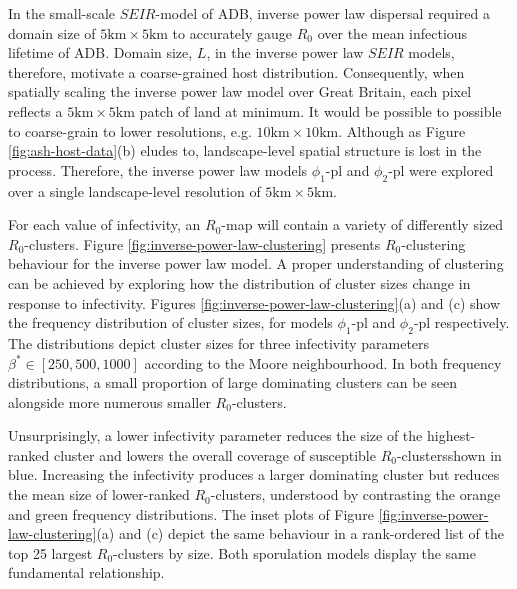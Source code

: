In the small-scale $SEIR$-model of ADB, inverse power law dispersal required a domain size of $\mathrm{5km \times 5km}$ to accurately gauge $R_0$ over the mean infectious lifetime of ADB.
Domain size, $L$, in the inverse power law $SEIR$ models, therefore, motivate a coarse-grained host distribution.
Consequently, when spatially scaling the inverse power law model over Great Britain, each pixel reflects a $\mathrm{5km \times 5km}$ patch of land at minimum.
It would be possible to possible to coarse-grain to lower resolutions, e.g. $\mathrm{10km \times 10km}$.
Although as Figure \ref{fig:ash-host-data}(b) eludes to, landscape-level spatial structure is lost in the process.
Therefore, the inverse power law models $\phi_1$-pl and $\phi_2$-pl were explored over a single landscape-level resolution of $\mathrm{5km \times 5km}$.

For each value of infectivity, an $R_0$-map will contain a variety of differently sized $R_0$-clusters.
Figure \ref{fig:inverse-power-law-clustering} presents $R_0$-clustering behaviour for the inverse power law model.
A proper understanding of clustering can be achieved by exploring how the distribution of cluster sizes change in response to infectivity. 
Figures \ref{fig:inverse-power-law-clustering}(a) and (c) show the frequency distribution of cluster sizes, 
for models $\phi_1$-pl and $\phi_2$-pl respectively.
The distributions depict cluster sizes for three infectivity parameters $\beta^* \in [250, 500, 1000]$ according to the Moore neighbourhood.
In both frequency distributions, a small proportion of large dominating clusters can be seen alongside more numerous smaller $R_0$-clusters.

Unsurprisingly, a lower infectivity parameter reduces the size of the highest-ranked cluster and lowers the overall coverage of susceptible $R_0$-clusters\textemdash shown in blue.
Increasing the infectivity produces a larger dominating cluster but reduces the mean size of lower-ranked $R_0$-clusters, 
understood by contrasting the orange and green frequency distributions.
The inset plots of Figure \ref{fig:inverse-power-law-clustering}(a) and (c) depict the same behaviour in a rank-ordered list of the top 25 largest $R_0$-clusters by size.
Both sporulation models display the same fundamental relationship.

